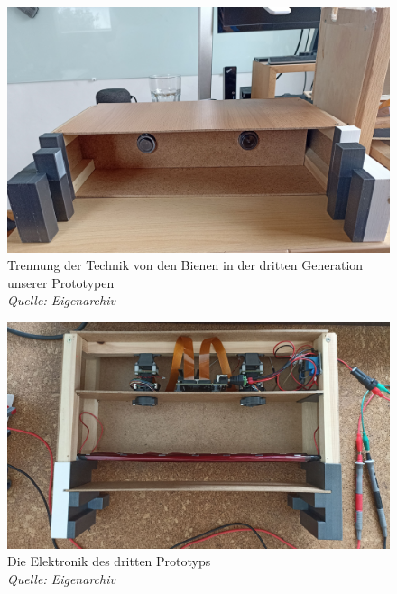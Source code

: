 \documentclass[11pt,a4paper]{article}
\begin{document}
\begin{figure}[H] \label{fig:third-generation-setup}
    \centering
    \includegraphics[width=.9\textwidth]{images/third-prototype-electronics-2.jpg}
    \caption{Trennung der Technik von den Bienen in der dritten Generation unserer Prototypen\\
    \textit{Quelle: Eigenarchiv}}
\end{figure}

\begin{figure}[H] \label{fig:third-generation-electronics}
    \centering
    \includegraphics[width=.9\textwidth]{images/third-prototype-electronics-1.jpg}
    \caption{Die Elektronik des dritten Prototyps \\
    \textit{Quelle: Eigenarchiv}}
\end{figure}
\end{document}
